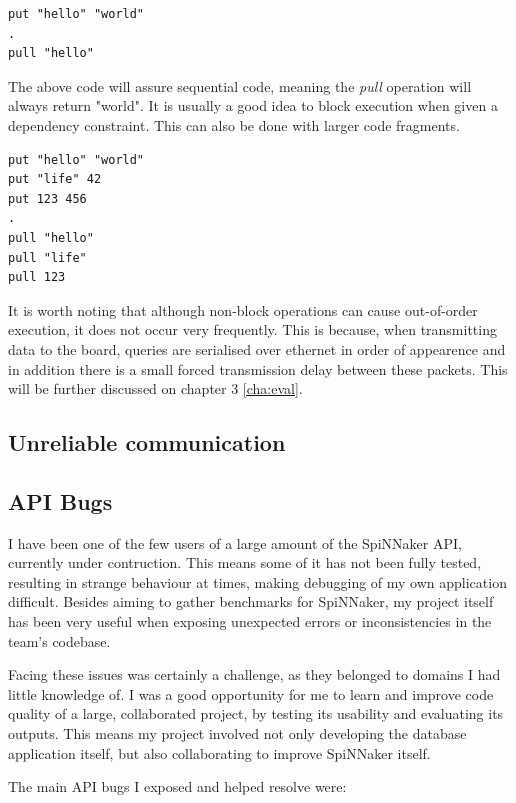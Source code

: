 \begin{lstlisting}[caption={Blocking execution}, label=list:blocking1]
put "hello" "world"
.
pull "hello"
\end{lstlisting}

The above code will assure sequential code, meaning the \textit{pull} operation will always return "world". It is usually a good idea to block execution when given a dependency constraint. This can also be done with larger code fragments.

\begin{lstlisting}[caption={Blocking execution}, label=list:blocking2]
put "hello" "world"
put "life" 42
put 123 456
.
pull "hello"
pull "life"
pull 123
\end{lstlisting}

It is worth noting that although non-block operations can cause out-of-order execution, it does not occur very frequently. This is because, when transmitting data to the board, queries are serialised over ethernet in order of appearence and in addition there is a small forced transmission delay between these packets. This will be further discussed on chapter 3 \ref{cha:eval}.


\subsection{Unreliable communication}

\subsection{API Bugs}
I have been one of the few users of a large amount of the SpiNNaker API, currently under contruction. This means some of it has not been fully tested, resulting in strange behaviour at times, making debugging of my own application difficult. Besides aiming to gather benchmarks for SpiNNaker, my project itself has been very useful when exposing unexpected errors or inconsistencies in the team's codebase.

Facing these issues was certainly a challenge, as they belonged to domains I had little knowledge of. I was a good opportunity for me to learn and improve code quality of a large, collaborated project, by testing its usability and evaluating its outputs. This means my project involved not only developing the database application itself, but also collaborating to improve SpiNNaker itself.

The main API bugs I exposed and helped resolve were:


